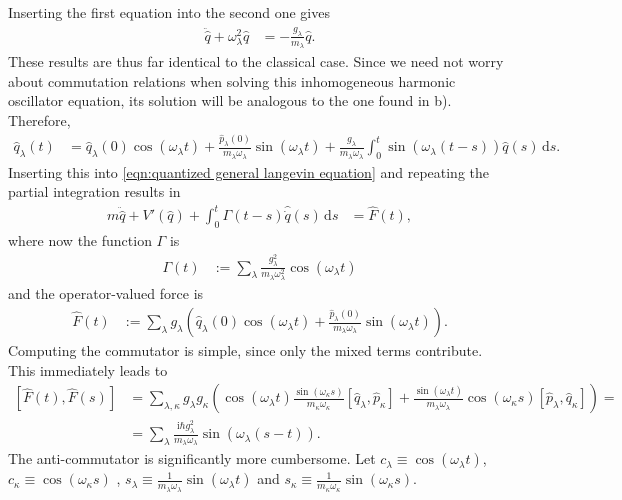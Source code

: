 \documentclass[english, parskip=full]{scrartcl}
\newcommand{\intx}{}
\newcommand{\kla}{}
\newcommand{\klam}{}
\renewcommand{\i}{\text{i}}
\begin{document}
Inserting the first equation into the second one gives
\begin{align}
\ddot{\hat{q}}+\omega_\lambda^2\hat{q}&=-\frac{g_\lambda}{m_\lambda}\hat{q}.
\end{align}
These results are thus far identical to the classical case.
Since we need not worry about commutation relations when solving this inhomogeneous harmonic oscillator equation, its solution will be analogous to the one found in b).
Therefore, 
\begin{align}
\hat{q}_\lambda(t)&=\hat{q}_\lambda(0)\cos (\omega_\lambda t)+\frac{\hat{p}_\lambda(0)}{m_\lambda\omega_\lambda}\sin(\omega_\lambda t) + \frac{g_\lambda}{m_\lambda\omega_\lambda}\intx\int_{0}^{t}\sin\kla\left( \omega_\lambda (t-s) \right)\hat{q}(s)\, \mathrm{d}s.
\end{align}
Inserting this into \eqref{eqn:quantized general langevin equation} and repeating the partial integration results in
\begin{align}
m\ddot{\hat{q}}+V'(\hat{q})+\intx\int_{0}^{t}\Gamma(t-s)\hat{\dot{q}}(s)\, \mathrm{d}s&=\hat{F}(t),
\end{align}
where now the function $\Gamma$ is
\begin{align}
\Gamma(t)&:=\sum_\lambda\frac{g_\lambda^2}{m_\lambda\omega_\lambda^2}\cos(\omega_\lambda t)
\end{align}
and the operator-valued force is
\begin{align}
\hat{F}(t)&:=\sum_\lambda g_\lambda\kla\left( \hat{q}_\lambda(0)\cos(\omega_\lambda t) + \frac{\hat{p}_\lambda(0)}{m_\lambda\omega_\lambda}\sin(\omega_\lambda t) \right).
\end{align}
Computing the commutator is simple, since only the mixed terms contribute.
This immediately leads to
\begin{align}
\klam\left[ \hat{F}(t),\hat{F}(s) \right]&=\sum_{\lambda,\kappa}g_\lambda g_\kappa\kla\left( \cos(\omega_\lambda t)\frac{\sin(\omega_\kappa s)}{m_\kappa\omega_\kappa}\klam\left[ \hat{q}_\lambda,\hat{p}_\kappa \right] + \frac{\sin(\omega_\lambda t)}{m_\lambda\omega_\lambda}\cos(\omega_\kappa s)\klam\left[ \hat{p}_\lambda, \hat{q}_\kappa \right] \right)=\\
&=\sum_\lambda\frac{\i\hbar g_\lambda^2}{m_\lambda\omega_\lambda}\sin\kla\left( \omega_\lambda (s-t) \right).
\end{align}
The anti-commutator is significantly more cumbersome.
Let $c_\lambda\equiv\cos(\omega_\lambda t)$, $c_\kappa\equiv\cos(\omega_\kappa s)$ , $s_\lambda\equiv\frac{1}{m_\lambda\omega_\lambda}\sin(\omega_\lambda t)$ and $s_\kappa\equiv\frac{1}{m_\kappa\omega_\kappa}\sin(\omega_\kappa s)$.
\end{document}
